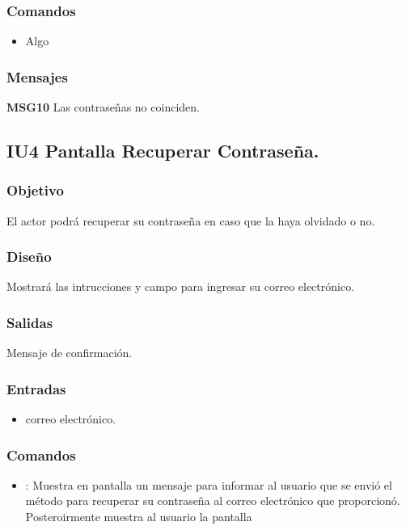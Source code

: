 \subsubsection{Comandos}
\begin{itemize}
	\item Algo
\end{itemize}

\subsubsection{Mensajes}
\begin{Citemize}
	\item {\bf MSG10} Las contraseñas no coinciden.
	
\end{Citemize}

\subsection{IU4 Pantalla Recuperar Contraseña.}

\subsubsection{Objetivo}
	El actor podrá recuperar su contraseña en caso que la haya olvidado o no.

\subsubsection{Diseño}
	Mostrará las intrucciones y campo para ingresar su correo electrónico.


\subsubsection{Salidas}

	Mensaje de confirmación.

\subsubsection{Entradas}

\begin{itemize}
	\item correo electrónico.
\end{itemize}

\subsubsection{Comandos}
\begin{itemize}
	\item {}: Muestra en pantalla un mensaje para informar al usuario que se envió el método 
	para recuperar su contraseña al correo electrónico que proporcionó. Posteroirmente muestra al usuario
	la pantalla 
\end{itemize}

